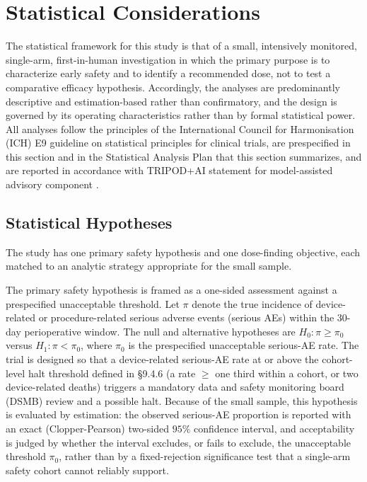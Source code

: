\section{Statistical Considerations}

The statistical framework for this study is that of a small, intensively
monitored, single-arm, first-in-human investigation in which the primary purpose
is to characterize early safety and to identify a recommended dose, not to test a
comparative efficacy hypothesis. Accordingly, the analyses are predominantly
descriptive and estimation-based rather than confirmatory, and the design is
governed by its operating characteristics rather than by formal statistical power.
All analyses follow the principles of the International Council for Harmonisation
(ICH) E9 guideline on statistical principles for clinical trials, are prespecified
in this section and in the Statistical Analysis Plan that this section
summarizes, and are reported in accordance with TRIPOD+AI statement for model-assisted advisory component \cite{Collins2024tripodai}.

\subsection{Statistical Hypotheses}

The study has one primary safety hypothesis and one dose-finding objective, each
matched to an analytic strategy appropriate for the small sample.

The primary safety hypothesis is framed as a one-sided assessment against a
prespecified unacceptable threshold. Let $\pi$ denote the true incidence of
device-related or procedure-related serious adverse events (serious AEs) within
the 30-day perioperative window. The null and alternative hypotheses are
$H_0\!: \pi \geq \pi_0$ versus $H_1\!: \pi < \pi_0$, where $\pi_0$ is the
prespecified unacceptable serious-AE rate. The trial is designed so that a
device-related serious-AE rate at or above the cohort-level halt threshold defined
in \S9.4.6 (a rate $\geq$ one third within a cohort, or two device-related deaths)
triggers a mandatory data and safety monitoring board (DSMB) review and a possible
halt. Because of the small sample, this hypothesis is evaluated by estimation: the
observed serious-AE proportion is reported with an exact (Clopper-Pearson) two-sided
$95\%$ confidence interval, and acceptability is judged by whether the interval
excludes, or fails to exclude, the unacceptable threshold $\pi_0$, rather than by a
fixed-rejection significance test that a single-arm safety cohort cannot reliably
support.

